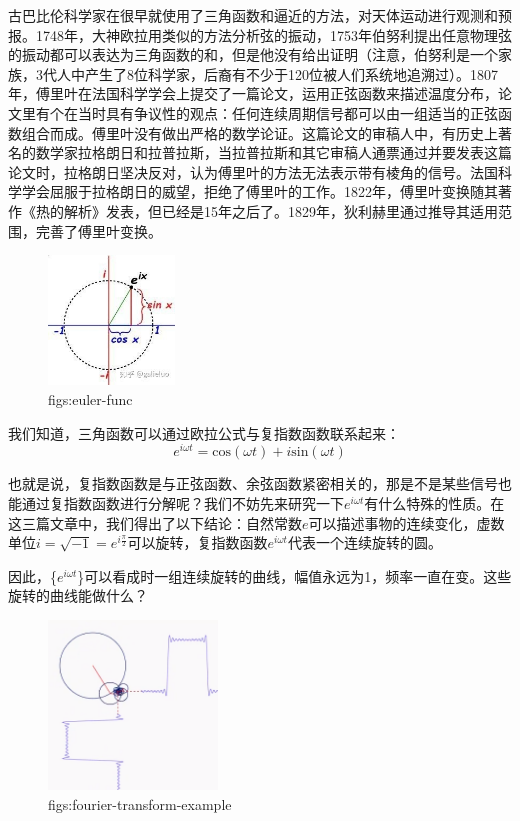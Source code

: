 \documentclass[lang=cn,11pt,a4paper,cite=numbers]{elegantpaper}
\begin{document}
  古巴比伦科学家在很早就使用了三角函数和逼近的方法，对天体运动进行观测和预报。1748年，大神欧拉用类似的方法分析弦的振动，1753年伯努利提出任意物理弦的振动都可以表达为三角函数的和，但是他没有给出证明（注意，伯努利是一个家族，3代人中产生了8位科学家，后裔有不少于120位被人们系统地追溯过）。1807年，傅里叶在法国科学学会上提交了一篇论文，运用正弦函数来描述温度分布，论文里有个在当时具有争议性的观点：任何连续周期信号都可以由一组适当的正弦函数组合而成。傅里叶没有做出严格的数学论证。这篇论文的审稿人中，有历史上著名的数学家拉格朗日和拉普拉斯，当拉普拉斯和其它审稿人通票通过并要发表这篇论文时，拉格朗日坚决反对，认为傅里叶的方法无法表示带有棱角的信号。法国科学学会屈服于拉格朗日的威望，拒绝了傅里叶的工作。1822年，傅里叶变换随其著作《热的解析》发表，但已经是15年之后了。1829年，狄利赫里通过推导其适用范围，完善了傅里叶变换。

\begin{figure}[!htb]
  \centering
  \includegraphics[width=0.3\textwidth]{figs/euler-func.png}
  \caption{figs:euler-func}
  \label{figs:euler-func}
\end{figure}
  我们知道，三角函数可以通过欧拉公式与复指数函数联系起来：
\begin{equation}
  e^{i{\omega}t}=\mathrm{cos}({\omega}t)+i\mathrm{sin}({\omega}t)
\end{equation}

  也就是说，复指数函数是与正弦函数、余弦函数紧密相关的，那是不是某些信号也能通过复指数函数进行分解呢？我们不妨先来研究一下$e^{i{\omega}t}$有什么特殊的性质。在这三篇文章\cite{fourier-transform-secret,nature-e-engineer-1,euler-formula}中，我们得出了以下结论：自然常数$e$可以描述事物的连续变化，虚数单位$i=\sqrt{-1}=e^{i\frac{\pi}{2}}$可以旋转，复指数函数$e^{i{\omega}t}$代表一个连续旋转的圆。

  因此，\{$e^{i{\omega}t}$\}可以看成时一组连续旋转的曲线，幅值永远为1，频率一直在变。这些旋转的曲线能做什么？
\begin{figure}[!htb]
  \centering
  \includegraphics[width=0.4\textwidth]{figs/fourier-transform-example.png}
  \caption{figs:fourier-transform-example}
  \label{figs:fourier-transform-example}
\end{figure}
\end{document}
